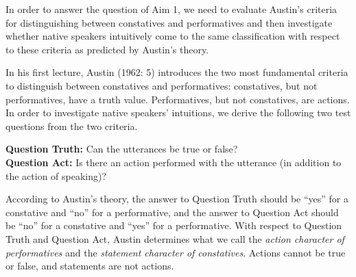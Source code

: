 \documentclass[egregdoesnotlikesansseriftitles,12pt]{scrartcl}
\begin{document}
In order to answer the question of Aim 1, we need to evaluate Austin's criteria for distinguishing between constatives and performatives and then investigate whether native speakers intuitively come to the same classification with respect to these criteria as predicted by Austin's theory.

In his first lecture, Austin (1962: 5) introduces the two most fundamental criteria to distinguish between constatives and performatives: constatives, but not performatives, have a truth value. Performatives, but not constatives, are actions. In order to investigate native speakers' intuitions, we derive the following two test questions from the two criteria.\\

\begin{addmargin}[11pt]{0pt}
   \textbf{Question Truth:} Can the utterances be true or false?\\
   
   \noindent\textbf{Question Act:} Is there an action performed with the utterance (in addition to the action of speaking)?\\
\end{addmargin}

\noindent According to Austin's theory, the answer to Question Truth should be ``yes'' for a constative and ``no'' for a performative, and the answer to Question Act should be ``no'' for a constative and ``yes'' for a performative. With respect to Question Truth and Question Act, Austin determines what we call the \textit{action character of performatives} and the \textit{statement character of constatives}. Actions cannot be true or false, and statements are not actions.
\end{document}

